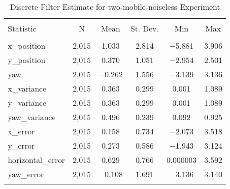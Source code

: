 
\begin{table}[h] \centering 
  \caption{Discrete Filter Estimate for two-mobile-noiseless Experiment} 
  \label{tab:two_mobile_noiseless_discrete_summary} 
\begin{tabular}{@{\extracolsep{5pt}}lccccc} 
\\[-1.8ex]\hline 
\hline \\[-1.8ex] 
Statistic & \multicolumn{1}{c}{N} & \multicolumn{1}{c}{Mean} & \multicolumn{1}{c}{St. Dev.} & \multicolumn{1}{c}{Min} & \multicolumn{1}{c}{Max} \\ 
\hline \\[-1.8ex] 
x\_position & 2,015 & 1.033 & 2.814 & $-$5.881 & 3.906 \\ 
y\_position & 2,015 & 0.370 & 1.051 & $-$2.954 & 2.501 \\ 
yaw & 2,015 & $-$0.262 & 1.556 & $-$3.139 & 3.136 \\ 
x\_variance & 2,015 & 0.363 & 0.299 & 0.001 & 1.089 \\ 
y\_variance & 2,015 & 0.363 & 0.299 & 0.001 & 1.089 \\ 
yaw\_variance & 2,015 & 0.496 & 0.239 & 0.092 & 0.925 \\ 
x\_error & 2,015 & 0.158 & 0.734 & $-$2.073 & 3.518 \\ 
y\_error & 2,015 & 0.273 & 0.586 & $-$1.943 & 3.124 \\ 
horizontal\_error & 2,015 & 0.629 & 0.766 & 0.000003 & 3.592 \\ 
yaw\_error & 2,015 & $-$0.108 & 1.691 & $-$3.136 & 3.140 \\ 
\hline \\[-1.8ex] 
\end{tabular} 
\end{table} 
